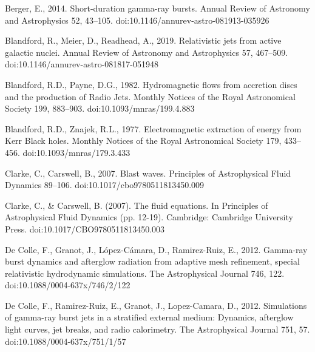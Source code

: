 \documentclass[12pt,a4paper]{book}
\begin{document}
\begin{thebibliography}{40}

Berger, E., 2014. Short-duration gamma-ray bursts. Annual Review of Astronomy and Astrophysics 52, 43–105. doi:10.1146/annurev-astro-081913-035926 

 Blandford, R., Meier, D., Readhead, A., 2019. Relativistic jets from active galactic nuclei. Annual Review of Astronomy and Astrophysics 57, 467–509. doi:10.1146/annurev-astro-081817-051948 

 Blandford, R.D., Payne, D.G., 1982. Hydromagnetic flows from accretion discs and the production of Radio Jets. Monthly Notices of the Royal Astronomical Society 199, 883–903. 
doi:10.1093/mnras/199.4.883 

 Blandford, R.D., Znajek, R.L., 1977. Electromagnetic extraction of energy from Kerr Black holes. Monthly Notices of the Royal Astronomical Society 179, 433–456. 
doi:10.1093/mnras/179.3.433

Clarke, C., Carswell, B., 2007. Blast waves. Principles of Astrophysical Fluid Dynamics 89–106. doi:10.1017/cbo9780511813450.009 

Clarke, C., \& Carswell, B. (2007). The fluid equations. In Principles of Astrophysical Fluid Dynamics (pp. 12-19). 
Cambridge: Cambridge University Press. doi:10.1017/CBO9780511813450.003

 De Colle, F., Granot, J., López-Cámara, D., Ramirez-Ruiz, E., 2012. Gamma-ray burst dynamics and afterglow radiation from adaptive mesh refinement, special relativistic hydrodynamic simulations. 
The Astrophysical Journal 746, 122. doi:10.1088/0004-637x/746/2/122  

 De Colle, F., Ramirez-Ruiz, E., Granot, J., Lopez-Camara, D., 2012. Simulations of gamma-ray burst jets in a stratified external medium: Dynamics, afterglow light 
curves, jet breaks, and radio calorimetry. The Astrophysical Journal 751, 57. doi:10.1088/0004-637x/751/1/57 


\end{thebibliography}
\end{document}
